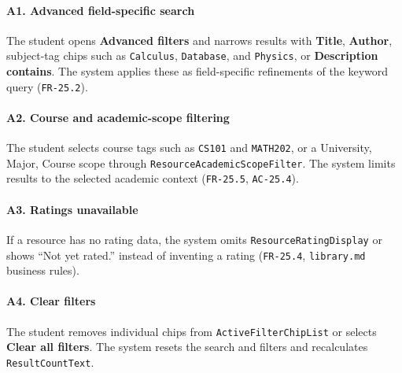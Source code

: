 \documentclass[12pt]{article}
\begin{document}
\hypertarget{sec:a1-advanced-field-specific-search}{}
\paragraph*{A1. Advanced field-specific search}
\par\medskip

The student opens \textbf{Advanced filters} and narrows results with \textbf{Title}, \textbf{Author}, subject-tag chips such as \texttt{Calculus}, \texttt{Database}, and \texttt{Physics}, or \textbf{Description contains}. The system applies these as field-specific refinements of the keyword query (\texttt{FR-25.2}).
\par\medskip

\hypertarget{sec:a2-course-and-academic-scope-filtering}{}
\paragraph*{A2. Course and academic-scope filtering}
\par\medskip

The student selects course tags such as \texttt{CS101} and \texttt{MATH202}, or a University, Major, Course scope through \texttt{ResourceAcademicScopeFilter}. The system limits results to the selected academic context (\texttt{FR-25.5}, \texttt{AC-25.4}).
\par\medskip

\hypertarget{sec:a3-ratings-unavailable}{}
\paragraph*{A3. Ratings unavailable}
\par\medskip

If a resource has no rating data, the system omits \texttt{ResourceRatingDisplay} or shows “Not yet rated.” instead of inventing a rating (\texttt{FR-25.4}, \texttt{library.md} business rules).
\par\medskip

\hypertarget{sec:a4-clear-filters}{}
\paragraph*{A4. Clear filters}
\par\medskip

The student removes individual chips from \texttt{ActiveFilterChipList} or selects \textbf{Clear all filters}. The system resets the search and filters and recalculates \texttt{ResultCountText}.
\par\medskip
\end{document}

